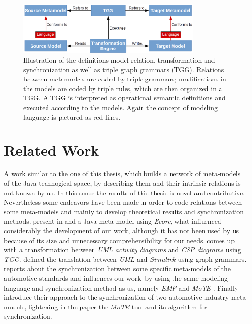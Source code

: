 \documentclass[tuberlin,cic,tc,english,noabntcite]{iiufrgs}
\begin{document}
\begin{description}
	\begin{figure}[h]
	    \caption{Illustration of the definitions model relation, transformation and synchronization as well as triple graph grammars (TGG). Relations between metamodels are coded by triple grammars; modifications in the models are coded by triple rules, which are then organized in a TGG. A TGG is interpreted as operational semantic definitions and executed according to the models. Again the concept of modeling language is pictured as red lines.}
	    \begin{center}
	        \includegraphics[width=25em]{transformation_scheme}
	    \end{center}
	    \label{fig:transformation_scheme}
	\end{figure}
\end{description}

\section{Related Work}
A work similar to the one of this thesis, which builds a network of meta-models of the Java technogical space, by describing them and their intrinsic relations is not known by us. In this sense the results of this thesis is novel and contributive. Nevertheless some endeavors have been made in order to code relations between some meta-models and mainly to develop theoretical results and synchronization methods. \citeauthor{heidenreich2010closing} present in \citeyearpar{heidenreich2009jamopp} and \citeyearpar{heidenreich2010closing} a Java meta-model using \emph{Ecore}, what influenced considerably the development of our work, although it has not been used by us because of its size and unnecessary comprehensibility for our needs. \citet{greenyer2008tggs} comes up with a transformation between \emph{UML activity diagrams} and \emph{CSP diagrams} using \emph{TGG}. \citet{foss2011uml} defined the translation between \emph{UML} and \emph{Simulink} using graph grammars. \citet{blouin2014synchronization} reports about the synchronization between some specific meta-models of the automotive standards and influences our work, by using the same modeling language and synchronization method as us, namely \emph{EMF} \citep{steinberg2008emf} and \emph{MoTE} \citep{giese2010toward}. Finally \citet{giese2010model} introduce their approach to the synchronization of two automotive industry meta-models, lightening in the paper the \emph{MoTE} tool and its algorithm for synchronization.
\end{document}
